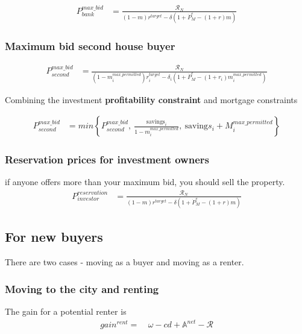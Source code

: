 {\begin{eqnarray}\label{eqn-max-investment-bid}
P_{bank}^{max\_bid} & = \frac{\mathcal{R}_N}{(1-m)r^{target}-\delta \left(1 + \dot P_M^e - (1+r)m\right)} 
\end{eqnarray}


\subsubsection{Maximum bid second house buyer}

 \begin{eqnarray}\label{eqn-max-second-bid}
P_{second}^{max\_bid} & = \frac{\mathcal{R}_N}{(1-m_i^{max\_permitted})r_i^{target}-\delta_i \left(1 + \dot P_M^e - (1+r_i)m_i^{max\_permitted}\right)}  \nonumber
\end{eqnarray}

Combining the investment \textbf{profitability constraint} and mortgage constraints

\begin{eqnarray}
P_{second}^{max\_bid} & = min \left\{P_{second}^{max\_bid},\ \frac{\mathrm{savings}_i}{1-m_i^{max\_permitted}},\ \mathrm{saving}s_i + M_i^{max\_permitted}  \right\}  \nonumber
\end{eqnarray}

\subsubsection{Reservation prices for investment owners}
 if anyone offers more than your maximum bid, you should sell the property. 
\begin{eqnarray}
P_{investor}^{reservation} & =    \frac{\mathcal{R}_N}{(1-m)r^{target}-\delta \left(1 + \dot P_M^e - (1+r)m\right)}  \nonumber\end{eqnarray}


\subsection{For new buyers}

There are two cases - moving as a buyer and moving as a renter.

\subsubsection{Moving to the city and renting}
The gain for a potential renter is 
\begin{align}
gain^{rent}
=&\ \omega-cd+\mathbb{A}^{net}-\mathcal{R}
  \nonumber
\end{align}

}
